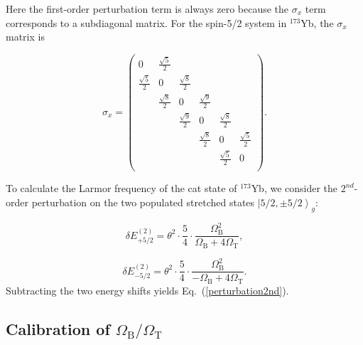 \documentclass[pdflatex,sn-nature,centre]{sn-jnl}%
\begin{document}
Here the first-order perturbation term is always zero because the $\sigma_x$ term corresponds to a subdiagonal matrix. 
For the spin-5/2 system in $^{173}$Yb, the $\sigma_x$ matrix is

\begin{equation}
\sigma_x = 
    \begin{pmatrix}
        0 & \frac{\sqrt{5}}{2} & & & & \\
        \frac{\sqrt{5}}{2} & 0 & \frac{\sqrt{8}}{2} & & & \\
         & \frac{\sqrt{8}}{2} & 0 & \frac{\sqrt{9}}{2} & & \\
         & & \frac{\sqrt{9}}{2} & 0 & \frac{\sqrt{8}}{2} & \\
         & & & \frac{\sqrt{8}}{2} & 0 & \frac{\sqrt{5}}{2}\\
         & & & & \frac{\sqrt{5}}{2} & 0 \\
    \end{pmatrix}.
\end{equation}

To calculate the Larmor frequency of the cat state of $^{173}$Yb, we consider the $2^{nd}$-order perturbation on the two populated stretched states $\left\vert5/2,\pm5/2\right\rangle_g$:

\begin{equation}\label{E+5/2}
    \delta E_{+5/2}^{(2)} = \theta^2\cdot\dfrac{5}{4}\cdot\dfrac{\Omega_{\mathrm B}^2}{\Omega_{\mathrm B}+4\Omega_{\mathrm T}},
\end{equation}

\begin{equation}\label{E-5/2}
    \delta E_{-5/2}^{(2)} = \theta^2\cdot\dfrac{5}{4}\cdot\dfrac{\Omega_{\mathrm B}^2}{-\Omega_{\mathrm B}+4\Omega_{\mathrm T}}.
\end{equation}
Subtracting the two energy shifts yields Eq.~(\ref{perturbation2nd}).



\subsection*{Calibration of $\Omega_{\mathrm B}/\Omega_{\mathrm T}$ }
\end{document}
